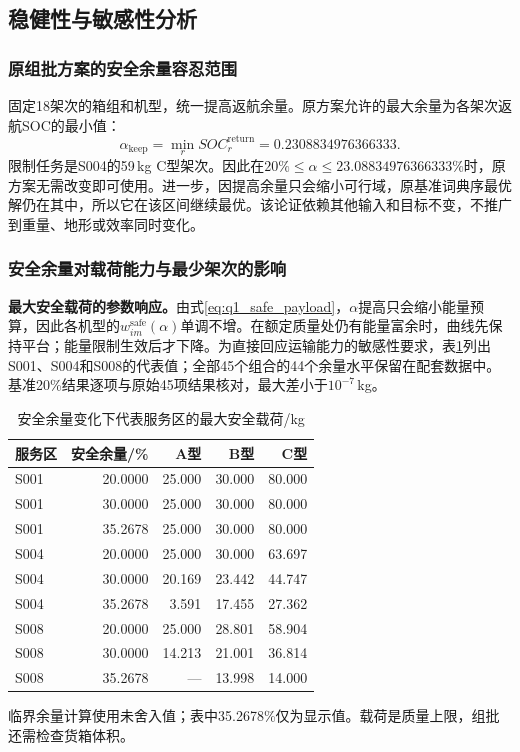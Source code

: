 \documentclass[withoutpreface,colorprint]{format}
\numberwithin{equation}{section}
\numberwithin{figure}{section}
\numberwithin{table}{section}
\begin{document}
\subsection{稳健性与敏感性分析}
\label{sec:q1_robust}
\subsubsection{原组批方案的安全余量容忍范围}
固定18架次的箱组和机型，统一提高返航余量。原方案允许的最大余量为各架次返航SOC的最小值：
\begin{equation}
 \alpha_{\mathrm{keep}}=\min_r SOC_r^{\mathrm{return}}=0.2308834976366333.
\label{eq:q1_keep}
\end{equation}
限制任务是S004的59\,kg C型架次。因此在$20\%\le\alpha\le23.08834976366333\%$时，原方案无需改变即可使用。进一步，因提高余量只会缩小可行域，原基准词典序最优解仍在其中，所以它在该区间继续最优。该论证依赖其他输入和目标不变，不推广到重量、地形或效率同时变化。

\subsubsection{安全余量对载荷能力与最少架次的影响}
\textbf{最大安全载荷的参数响应。}由式\eqref{eq:q1_safe_payload}，$\alpha$提高只会缩小能量预算，因此各机型的$w_{im}^{\mathrm{safe}}(\alpha)$单调不增。在额定质量处仍有能量富余时，曲线先保持平台；能量限制生效后才下降。为直接回应运输能力的敏感性要求，表\ref{tab:q1_payload_response}列出S001、S004和S008的代表值；全部45个组合的44个余量水平保留在配套数据中。基准20\%结果逐项与原始45项结果核对，最大差小于$10^{-7}$\,kg。

\begin{table}[htbp]\centering\small
\caption{安全余量变化下代表服务区的最大安全载荷/kg}\label{tab:q1_payload_response}
\begin{tabular}{lrrrr}\toprule 服务区 & 安全余量/\% & A型 & B型 & C型\\\midrule
S001 & 20.0000 & 25.000 & 30.000 & 80.000\\
S001 & 30.0000 & 25.000 & 30.000 & 80.000\\
S001 & 35.2678 & 25.000 & 30.000 & 80.000\\
S004 & 20.0000 & 25.000 & 30.000 & 63.697\\
S004 & 30.0000 & 20.169 & 23.442 & 44.747\\
S004 & 35.2678 & 3.591 & 17.455 & 27.362\\
S008 & 20.0000 & 25.000 & 28.801 & 58.904\\
S008 & 30.0000 & 14.213 & 21.001 & 36.814\\
S008 & 35.2678 & --- & 13.998 & 14.000\\
\bottomrule\end{tabular}
\par\smallskip\footnotesize 临界余量计算使用未舍入值；表中35.2678\%仅为显示值。载荷是质量上限，组批还需检查货箱体积。
\end{table}
\end{document}
